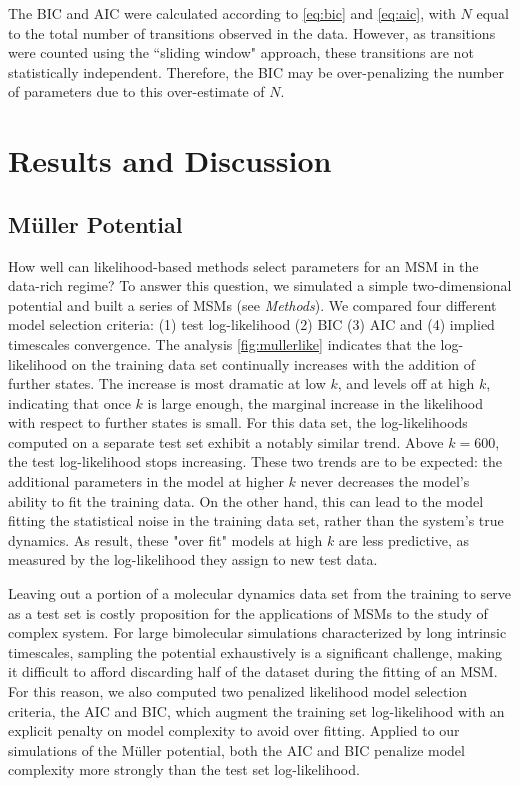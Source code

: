 \documentclass[journal=jpcbfk, layout=traditional, manuscript=article]{achemso}
\begin{document}
The BIC and AIC were calculated according to \cref{eq:bic} and \cref{eq:aic}, with $N$ equal to the total number of transitions observed in the data. However, as transitions were counted using the ``sliding window" approach, these transitions are not statistically independent\cite{Prinz2011Markov}. Therefore, the BIC may be over-penalizing the number of parameters due to this over-estimate of $N$.

\section{Results and Discussion}
\subsection{M\"{u}ller Potential}

How well can likelihood-based methods select parameters for an MSM in the data-rich regime? To answer this question, we simulated a simple two-dimensional potential and built a series of MSMs (see \emph{Methods}). We compared four different model selection criteria: (1) test log-likelihood (2) BIC (3) AIC and (4) implied timescales convergence. The analysis \cref{fig:mullerlike} indicates that the log-likelihood on the training data set continually increases with the addition of further states. The increase is most dramatic at low $k$, and levels off at high $k$, indicating that once $k$ is large enough, the marginal increase in the likelihood with respect to further states is small. For this data set, the log-likelihoods computed on a separate test set exhibit a notably similar trend. Above $k=600$, the test log-likelihood stops increasing. These two trends are to be expected: the additional parameters in the model at higher $k$ never decreases the model's ability to fit the training data. On the other hand, this can lead to the model fitting the statistical noise in the training data set, rather than the system's true dynamics. As result, these "over fit" models at high $k$ are less predictive, as measured by the log-likelihood they assign to new test data.

Leaving out a portion of a molecular dynamics data set from the training to serve as a test set is costly proposition for the applications of MSMs to the study of complex system. For large bimolecular simulations characterized by long intrinsic timescales, sampling the potential exhaustively is a significant challenge\cite{Lane2013Milliseconds}, making it difficult to afford discarding half of the dataset during the fitting of an MSM. For this reason, we also computed two penalized likelihood model selection criteria, the AIC and BIC, which augment the training set log-likelihood with an explicit penalty on model complexity to avoid over fitting. Applied to our simulations of the M\"{u}ller potential, both the AIC and BIC penalize model complexity more strongly than the test set log-likelihood.
\end{document}
